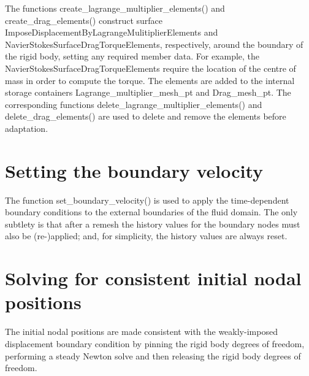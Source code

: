 The functions {\ttfamily create\+\_\+lagrange\+\_\+multiplier\+\_\+elements()} and {\ttfamily create\+\_\+drag\+\_\+elements()} construct surface {\ttfamily Impose\+Displacement\+By\+Lagrange\+Mulitiplier\+Elements} and {\ttfamily Navier\+Stokes\+Surface\+Drag\+Torque\+Elements}, respectively, around the boundary of the rigid body, setting any required member data. For example, the {\ttfamily Navier\+Stokes\+Surface\+Drag\+Torque\+Elements} require the location of the centre of mass in order to compute the torque. The elements are added to the internal storage containers {\ttfamily Lagrange\+\_\+multiplier\+\_\+mesh\+\_\+pt} and {\ttfamily Drag\+\_\+mesh\+\_\+pt}. The corresponding functions {\ttfamily delete\+\_\+lagrange\+\_\+multiplier\+\_\+elements()} and {\ttfamily delete\+\_\+drag\+\_\+elements()} are used to delete and remove the elements before adaptation.



 

\hypertarget{index_bc}{}\section{Setting the boundary velocity}\label{index_bc}
The function {\ttfamily set\+\_\+boundary\+\_\+velocity()} is used to apply the time-\/dependent boundary conditions to the external boundaries of the fluid domain. The only subtlety is that after a remesh the history values for the boundary nodes must also be (re-\/)applied; and, for simplicity, the history values are always reset.



 

\hypertarget{index_initial}{}\section{Solving for consistent initial nodal positions}\label{index_initial}
The initial nodal positions are made consistent with the weakly-\/imposed displacement boundary condition by pinning the rigid body degrees of freedom, performing a steady Newton solve and then releasing the rigid body degrees of freedom.



